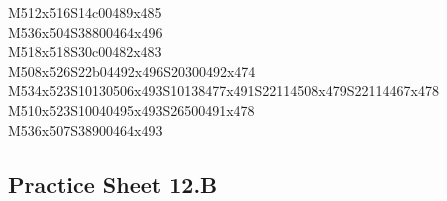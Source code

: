 \documentclass{article}
\begin{document}
\begin{multicols}{5}
\begin{center}
M512x516S14c00489x485 %
\\M536x504S38800464x496 %
\\M518x518S30c00482x483 %
\\M508x526S22b04492x496S20300492x474 %
\\M534x523S10130506x493S10138477x491S22114508x479S22114467x478 %
\\M510x523S10040495x493S26500491x478 %
\\M536x507S38900464x493 %
\vfil

\end{center}
\end{multicols}

\subsection{Practice Sheet 12.B}
\end{document}
